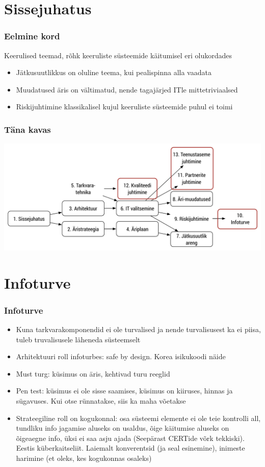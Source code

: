 

\maketitle

\section{Sissejuhatus}
\begin{frame}[fragile]
  \frametitle{Eelmine kord}
  Keerulised teemad, rõhk keeruliste süsteemide käitumisel eri olukordades
	\begin{itemize}
		\item Jätkusuutlikkus on oluline teema, kui pealispinna alla vaadata
		\item Muudatused äris on vältimatud, nende tagajärjed ITle mittetriviaalsed
		\item Riskijuhtimine klassikalisel kujul keeruliste süsteemide puhul ei toimi
	\end{itemize}
\end{frame}

\begin{frame}[fragile]
  \frametitle{Täna kavas}
		\includegraphics[width=\textwidth]{aine_struktuur_neljas.pdf}
\end{frame}

\section{Infoturve}
\begin{frame}[fragile]
  \frametitle{Infoturve}
	\begin{itemize}
		\item Kuna tarkvarakomponendid ei ole turvalised ja nende turvalisusest ka ei piisa, tuleb truvalisusele läheneda süsteemselt
		\item Arhitektuuri roll infoturbes: safe by design. Korea isikukoodi näide
		\item Must turg: küsimus on äris, kehtivad turu reeglid
		\item Pen test: küsimus ei ole sisse saamises, küsimus on kiiruses, hinnas ja sügavuses. Kui otse rünnatakse, siis ka maha võetakse
		\item Strateegiline roll on kogukonnal: osa süsteemi elemente ei ole teie kontrolli all, tundliku info jagamise aluseks on usaldus, õige käitumise aluseks on õigeaegne info, üksi ei saa asju ajada (Seepärast CERTide võrk tekkiski). Eestis küberkaitseliit. Laiemalt konverentsid (ja seal esinemine), inimeste harimine (et oleks, kes kogukonnas osaleks) 
	\end{itemize}
\end{frame}

